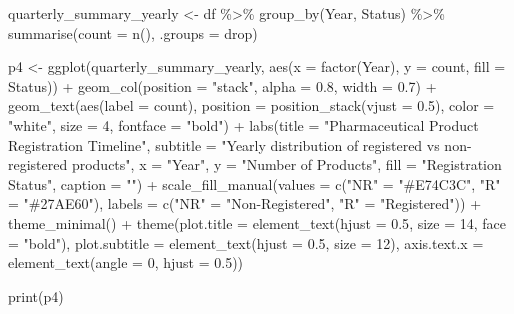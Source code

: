 \documentclass[
  letterpaper,
  DIV=11,
  numbers=noendperiod]{scrartcl}
\newenvironment{Shaded}{\begin{snugshade}}{\end{snugshade}}
\newcommand{\AttributeTok}[1]{\textcolor[rgb]{0.40,0.45,0.13}{#1}}
\newcommand{\DecValTok}[1]{\textcolor[rgb]{0.68,0.00,0.00}{#1}}
\newcommand{\FloatTok}[1]{\textcolor[rgb]{0.68,0.00,0.00}{#1}}
\newcommand{\FunctionTok}[1]{\textcolor[rgb]{0.28,0.35,0.67}{#1}}
\newcommand{\NormalTok}[1]{\textcolor[rgb]{0.00,0.23,0.31}{#1}}
\newcommand{\OtherTok}[1]{\textcolor[rgb]{0.00,0.23,0.31}{#1}}
\newcommand{\SpecialCharTok}[1]{\textcolor[rgb]{0.37,0.37,0.37}{#1}}
\newcommand{\StringTok}[1]{\textcolor[rgb]{0.13,0.47,0.30}{#1}}
\begin{document}
\begin{Shaded}
\begin{Highlighting}[]
\NormalTok{quarterly\_summary\_yearly }\OtherTok{\textless{}{-}}\NormalTok{ df }\SpecialCharTok{\%\textgreater{}\%}
  \FunctionTok{group\_by}\NormalTok{(Year, Status) }\SpecialCharTok{\%\textgreater{}\%}
  \FunctionTok{summarise}\NormalTok{(}\AttributeTok{count =} \FunctionTok{n}\NormalTok{(), }\AttributeTok{.groups =} \StringTok{\textquotesingle{}drop\textquotesingle{}}\NormalTok{)}

\NormalTok{p4 }\OtherTok{\textless{}{-}} \FunctionTok{ggplot}\NormalTok{(quarterly\_summary\_yearly, }\FunctionTok{aes}\NormalTok{(}\AttributeTok{x =} \FunctionTok{factor}\NormalTok{(Year), }\AttributeTok{y =}\NormalTok{ count, }\AttributeTok{fill =}\NormalTok{ Status)) }\SpecialCharTok{+}
  \FunctionTok{geom\_col}\NormalTok{(}\AttributeTok{position =} \StringTok{"stack"}\NormalTok{, }\AttributeTok{alpha =} \FloatTok{0.8}\NormalTok{, }\AttributeTok{width =} \FloatTok{0.7}\NormalTok{) }\SpecialCharTok{+}
  \FunctionTok{geom\_text}\NormalTok{(}\FunctionTok{aes}\NormalTok{(}\AttributeTok{label =}\NormalTok{ count), }\AttributeTok{position =} \FunctionTok{position\_stack}\NormalTok{(}\AttributeTok{vjust =} \FloatTok{0.5}\NormalTok{), }
            \AttributeTok{color =} \StringTok{"white"}\NormalTok{, }\AttributeTok{size =} \DecValTok{4}\NormalTok{, }\AttributeTok{fontface =} \StringTok{"bold"}\NormalTok{) }\SpecialCharTok{+}
  \FunctionTok{labs}\NormalTok{(}\AttributeTok{title =} \StringTok{"Pharmaceutical Product Registration Timeline"}\NormalTok{,}
       \AttributeTok{subtitle =} \StringTok{"Yearly distribution of registered vs non{-}registered products"}\NormalTok{,}
       \AttributeTok{x =} \StringTok{"Year"}\NormalTok{,}
       \AttributeTok{y =} \StringTok{"Number of Products"}\NormalTok{,}
       \AttributeTok{fill =} \StringTok{"Registration Status"}\NormalTok{,}
       \AttributeTok{caption =} \StringTok{""}\NormalTok{) }\SpecialCharTok{+}
  \FunctionTok{scale\_fill\_manual}\NormalTok{(}\AttributeTok{values =} \FunctionTok{c}\NormalTok{(}\StringTok{"NR"} \OtherTok{=} \StringTok{"\#E74C3C"}\NormalTok{, }\StringTok{"R"} \OtherTok{=} \StringTok{"\#27AE60"}\NormalTok{),}
                    \AttributeTok{labels =} \FunctionTok{c}\NormalTok{(}\StringTok{"NR"} \OtherTok{=} \StringTok{"Non{-}Registered"}\NormalTok{, }\StringTok{"R"} \OtherTok{=} \StringTok{"Registered"}\NormalTok{)) }\SpecialCharTok{+}
  \FunctionTok{theme\_minimal}\NormalTok{() }\SpecialCharTok{+}
  \FunctionTok{theme}\NormalTok{(}\AttributeTok{plot.title =} \FunctionTok{element\_text}\NormalTok{(}\AttributeTok{hjust =} \FloatTok{0.5}\NormalTok{, }\AttributeTok{size =} \DecValTok{14}\NormalTok{, }\AttributeTok{face =} \StringTok{"bold"}\NormalTok{),}
        \AttributeTok{plot.subtitle =} \FunctionTok{element\_text}\NormalTok{(}\AttributeTok{hjust =} \FloatTok{0.5}\NormalTok{, }\AttributeTok{size =} \DecValTok{12}\NormalTok{),}
        \AttributeTok{axis.text.x =} \FunctionTok{element\_text}\NormalTok{(}\AttributeTok{angle =} \DecValTok{0}\NormalTok{, }\AttributeTok{hjust =} \FloatTok{0.5}\NormalTok{))}

\FunctionTok{print}\NormalTok{(p4)}
\end{Highlighting}
\end{Shaded}
\end{document}
